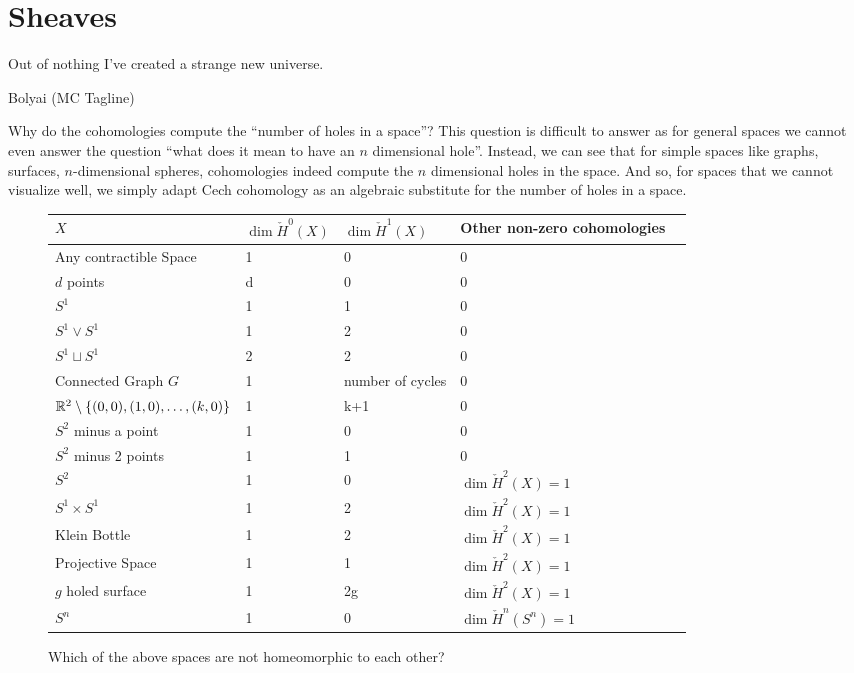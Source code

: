 

\section{Sheaves}
\epigraph{Out of nothing I've created a strange new universe.}{Bolyai (MC Tagline)}

Why do the cohomologies compute the ``number of holes in a space''? This question is difficult to answer as for general spaces we cannot even answer the question ``what does it mean to have an $n$ dimensional hole''. Instead, we can see that for simple spaces like graphs, surfaces, $n$-dimensional spheres, cohomologies indeed compute the $n$ dimensional holes in the space. And so, for spaces that we cannot visualize well, we simply adapt Cech cohomology as an algebraic substitute for the number of holes in a space.

\begin{figure}[H]
	\begin{tabular}{|l|l|l|l|l|}
		\hline
		$X$ & $\dim \check H^0(X)$ & $\dim \check H^1(X)$ & Other non-zero cohomologies\\\hline
		Any contractible Space & 1 & 0 & 0 \\
		$d$ points & d & 0 & 0\\
		$S^1$ & 1 & 1 & 0 \\
		$S^1 \vee S^1$ & 1 & 2 & 0 \\
		$S^1 \sqcup S^1$ & 2 & 2 & 0 \\
		Connected Graph $G$ & 1 & number of cycles & 0 \\
		 $ \mathbb{R}^2 \setminus \{(0,0), (1,0), \dots, (k,0) \}$  & 1 & k+1 & 0 \\
		 $ S^2 $ minus a point & 1 & 0 & 0 \\
		 $ S^2 $ minus 2 points & 1 & 1 & 0 \\
		 $ S^2 $ & 1 & 0 & $\dim \check H^2(X)=1$  \\
		 $ S^1 \times S^1 $ & 1 & 2 & $\dim \check H^2(X)=1$  \\
		 Klein Bottle & 1 & 2 & $\dim \check H^2(X)=1$  \\
		 Projective Space & 1 & 1 & $\dim \check H^2(X)=1$  \\
		 $g$ holed surface & 1 & 2g & $\dim \check H^2(X)=1$  \\
		 $S^n$ & 1 & 0 & $\dim \check H^n(S^n)=1$  \\\hline
	\end{tabular}
	\caption{Which of the above spaces are not homeomorphic to each other?}
\end{figure}

